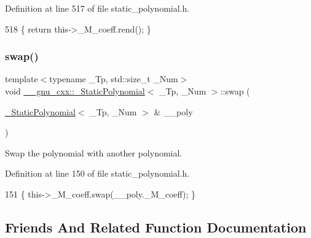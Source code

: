 Definition at line 517 of file static\+\_\+polynomial.\+h.


\begin{DoxyCode}
518       \{ \textcolor{keywordflow}{return} this->\_M\_coeff.rend(); \}
\end{DoxyCode}
\mbox{\label{class____gnu__cxx_1_1__StaticPolynomial_abdce33b479623cdfd003b9c73b1fd2d7}} 
\subsubsection{\texorpdfstring{swap()}{swap()}}
{\footnotesize\ttfamily template$<$typename \+\_\+\+Tp, std\+::size\+\_\+t \+\_\+\+Num$>$ \\
void \hyperlink{class____gnu__cxx_1_1__StaticPolynomial}{\+\_\+\+\_\+gnu\+\_\+cxx\+::\+\_\+\+Static\+Polynomial}$<$ \+\_\+\+Tp, \+\_\+\+Num $>$\+::swap (\begin{DoxyParamCaption}\item[{\hyperlink{class____gnu__cxx_1_1__StaticPolynomial}{\+\_\+\+Static\+Polynomial}$<$ \+\_\+\+Tp, \+\_\+\+Num $>$ \&}]{\+\_\+\+\_\+poly }\end{DoxyParamCaption})\hspace{0.3cm}{\ttfamily [inline]}}

Swap the polynomial with another polynomial. 

Definition at line 150 of file static\+\_\+polynomial.\+h.


\begin{DoxyCode}
151       \{ this->\_M\_coeff.swap(\_\_poly.\_M\_coeff); \}
\end{DoxyCode}


\subsection{Friends And Related Function Documentation}
\mbox{\label{class____gnu__cxx_1_1__StaticPolynomial_ae1001829bb41fadbad006ab00bc35c14}} 
